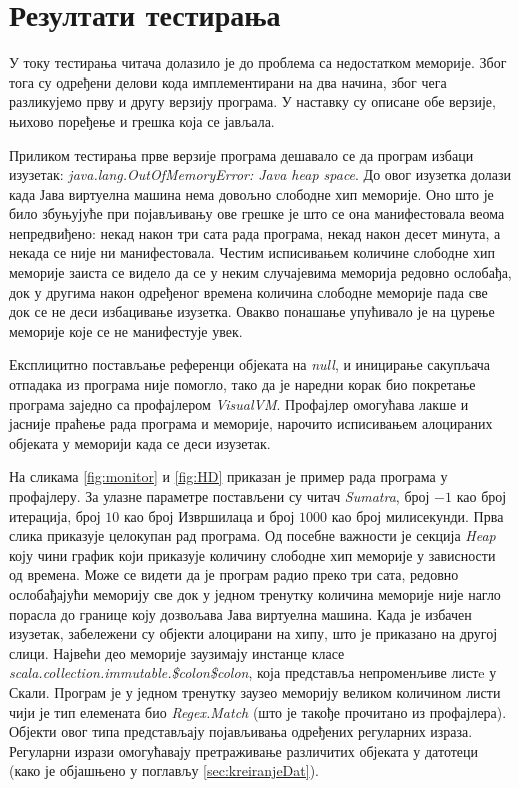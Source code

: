 \documentclass[12pt,oneside]{memoir}
\begin{document}
\section{Резултати тестирања}
\label{sec:rez}

У току тестирања читача долазило је до проблема са недостатком меморије. Због тога су одређени делови кода имплементирани на два начина, због чега разликујемо прву и другу верзију програма. У наставку су описане обе верзије, њихово поређење и грешка која се јављала.

Приликом тестирања прве верзије програма дешавало се да програм избаци изузетак: \textit{java.lang.OutOfMemoryError: Java heap space}. До овог изузетка долази када Јава виртуелна машина нема довољно слободне хип меморије. Оно што је било збуњујуће при појављивању ове грешке је што се она манифестовала веома непредвиђено: некад након три сата рада програма, некад након десет минута, а некада се није ни манифестовала. Честим исписивањем количине слободне хип меморије заиста се видело да се у неким случајевима меморија редовно ослобађа, док у другима након одређеног времена количина слободне меморије пада све док се не деси избацивање изузетка. Овакво понашање упућивало је на цурење меморије које се не манифестује увек.

Експлицитно постављање референци објеката на \textit{null}, и иницирање сакупљача отпадака из програма није помогло, тако да је наредни корак био покретање програма заједно са профајлером \textit{VisualVM}. Профајлер омогућава лакше и јасније праћење рада програма и меморије, нарочито исписивањем алоцираних објеката у меморији када се деси изузетак. 

На сликама \ref{fig:monitor} и \ref{fig:HD} приказан је пример рада програма у профајлеру. За улазне параметре постављени су читач \textit{Sumatra}, број $-1$ као број итерација, број $10$ као број Извршилаца и број $1000$ као број милисекунди. Прва слика приказује целокупан рад програма. Од посебне важности је секција \textit{Heap} коју чини график који приказује количину слободне хип меморије у зависности од времена. Може се видети да је програм радио преко три сата, редовно ослобађајући меморију све док у једном тренутку количина меморије није нагло порасла до границе коју дозвољава Јава виртуелна машина. Када је избачен изузетак, забележени су објекти алоцирани на хипу, што је приказано на другој слици. Највећи део меморије заузимају инстанце класе \textit{scala.collection.immutable.\$colon\$colon}, која представља непроменљиве листe у Скали. Програм је у једном тренутку заузео меморију великом количином листи чији је тип елемената био \textit{Regex.Match} (што је такође прочитано из профајлера). Објекти овог типа представљају појављивања одређених регуларних израза. Регуларни изрази  омогућавају претраживање различитих објеката у датотеци (како је објашњено у поглављу \ref{sec:kreiranjeDat}).
\end{document}
